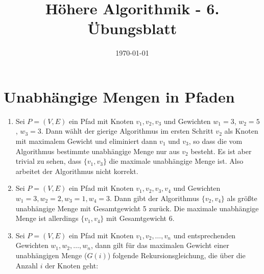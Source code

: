 \documentclass[a4paper,10pt]{scrartcl}
\title{H\"ohere Algorithmik - 6. \"Ubungsblatt}
\author{\Authors}
\date{\today}
\begin{document}
\maketitle

\section{Unabhängige Mengen in Pfaden}
\begin{enumerate}
 \item Sei $P = (V,E)$ ein Pfad mit Knoten $v_1, v_2, v_3$ und Gewichten
 $w_1 = 3$, $w_2 = 5$, $w_3 = 3$. Dann wählt der gierige Algorithmus im
 ersten Schritt $v_2$ als Knoten mit maximalem Gewicht und eliminiert
 dann $v_1$ und $v_3$, so dass die vom Algorithmus bestimmte unabhängige
 Menge nur aus $v_2$ besteht. Es ist aber trivial zu sehen, dass
 $\{v_1,v_3\}$ die
 maximale unabhängige Menge ist. Also
 arbeitet der Algorithmus nicht korrekt.
 \item Sei $P = (V,E)$ ein Pfad mit Knoten $v_1, v_2, v_3, v_4$ und
 Gewichten $w_1 = 3, w_2 = 2, w_3 = 1, w_4 = 3$. Dann gibt der
 Algorithmus $\{v_2,v_4\}$ als größte unabhängige Menge mit Gesamtgewicht
 5 zurück. Die maximale unabhängige Menge ist allerdings $\{v_1,v_4\}$ mit
 Gesamtgewicht 6.
 \item Sei $P = (V,E)$ ein Pfad mit Knoten $v_1, v_2, \hdots, v_n$ und entsprechenden Gewichten $w_1, w_2, \hdots, w_n$, dann gilt für das
  maximalen Gewicht einer unabhängigen Menge ($G(i)$) folgende Rekursionsgleichung, die über die Anzahl $i$ der Knoten geht:


\end{enumerate}
\end{document}
